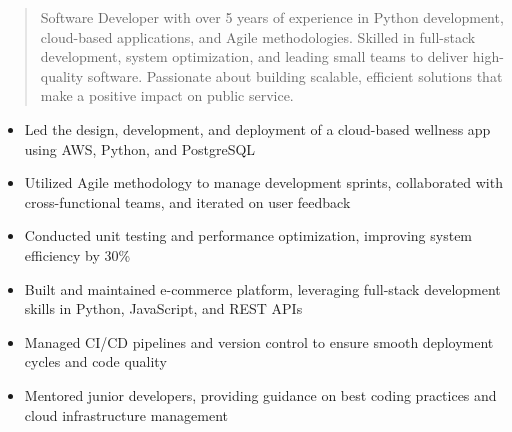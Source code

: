 



\makecvheader

\begin{quote}
  \noindent
  Software Developer with over 5 years of experience in Python development, cloud-based applications, and Agile methodologies. Skilled in full-stack development, system optimization, and leading small teams to deliver high-quality software. Passionate about building scalable, efficient solutions that make a positive impact on public service.
\end{quote}

\par\smallskip
\noindent
\begin{minipage}{20cm}
  \begin{minipage}{9.75cm}
    \begin{itemize}
      \item Led the design, development, and deployment of a cloud-based wellness app using AWS, Python, and PostgreSQL
      \item Utilized Agile methodology to manage development sprints, collaborated with cross-functional teams, and iterated on user feedback
      \item Conducted unit testing and performance optimization, improving system efficiency by 30\%
    \end{itemize}
  \end{minipage}
  \hfill
  \begin{minipage}{9.75cm}
    \begin{itemize}
      \item Built and maintained e-commerce platform, leveraging full-stack development skills in Python, JavaScript, and REST APIs
      \item Managed CI/CD pipelines and version control to ensure smooth deployment cycles and code quality
      \item Mentored junior developers, providing guidance on best coding practices and cloud infrastructure management
    \end{itemize}
  \end{minipage}
\end{minipage}
\par\smallskip
\divider

